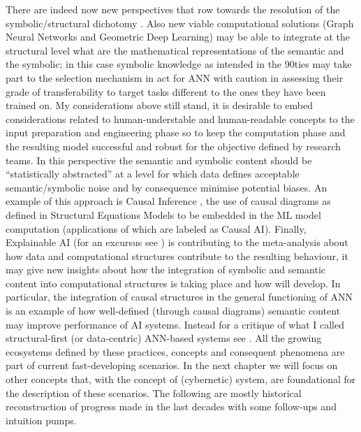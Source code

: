 \documentclass[14pt,a4paper]{extarticle}
\begin{document}
\newline
There are indeed now new perspectives that row towards the resolution of the symbolic/structural dichotomy \cite{Cheng2016,honavar1995}. Also new viable computational solutions (Graph Neural Networks and Geometric Deep Learning) may be able to integrate at the structural level what are the mathematical representations of the semantic and the symbolic; in this case symbolic knowledge as intended in the 90ties may take part to the selection mechanism in act for ANN with caution in assessing their grade of transferability to target tasks different to the ones they have been trained on. My considerations above still stand, it is desirable to embed considerations related to human-understable and human-readable concepts to the input preparation and engineering phase so to keep the computation phase and the resulting model successful and robust for the objective defined by research teams. In this perspective the semantic and symbolic content should be “statistically abstracted” at a level for which data defines acceptable semantic/symbolic noise and by consequence minimise potential biases. An example of this approach is Causal Inference \cite{pearl2009causality}, the use of causal diagrams as defined in Structural Equations Models to be embedded in the ML model computation (applications of which are labeled as Causal AI).
\newline
Finally, Explainable AI (for an excursus see \cite{savagebreaking}) is contributing to the meta-analysis about how data and computational structures contribute to the resulting behaviour, it may give new insights about how the integration of symbolic and semantic content into computational structures is taking place and how will develop. In particular, the integration of causal structures in the general functioning of ANN is an example of how well-defined (through causal diagrams) semantic content may improve performance of AI systems. Instead for a critique of what I called structural-first (or data-centric) ANN-based systems see \cite{Pearl2018}.
\newline
\hspace*{15mm}All the growing ecosystems defined by these practices, concepts and consequent phenomena are part of current fast-developing scenarios. In the next chapter we will focus on other concepts that, with the concept of (cybernetic) system, are foundational for the description of these scenarios. The following are mostly historical reconstruction of progress made in the last decades with some follow-ups and intuition pumps.
\end{document}
